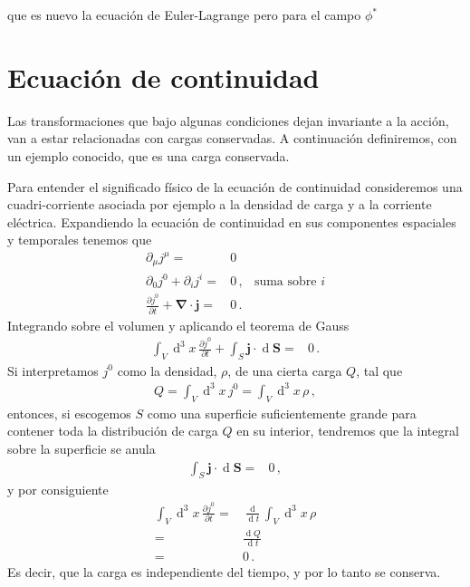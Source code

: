 que es nuevo la ecuación de Euler-Lagrange pero para el campo $\phi^*$



\section{Ecuación de continuidad}
\begin{frame}
Las transformaciones que bajo algunas condiciones dejan invariante a la acción, van a estar relacionadas con cargas conservadas. A continuación definiremos, con un ejemplo conocido, que es una carga conservada.

Para entender el significado físico de la ecuación de continuidad consideremos una cuadri-corriente asociada por ejemplo a la densidad de carga y a la corriente eléctrica. Expandiendo la ecuación de continuidad en sus componentes espaciales y temporales tenemos que
\begin{align}
  \partial_\mu j^\mu=&0&\nonumber\\
  \partial_0 j^0+ \partial_i j^i=&0\,,&\text{suma sobre $i$}\nonumber\\
  \frac{\partial j^0}{\partial t}+ \boldsymbol{\nabla}\cdot\boldsymbol{j}=&0\,.
\end{align}
Integrando sobre el volumen y aplicando el teorema de Gauss
\begin{align}
  \int_V \operatorname{d}^3x\,\frac{\partial j^0}{\partial t}
+\int_S \boldsymbol{j}\cdot \operatorname{d}  \boldsymbol{S}=&0\,.
\end{align}
Si interpretamos $j^0$ como la densidad, $\rho$, de una cierta carga $Q$, tal que
\begin{align}
  Q=\int_{V} \operatorname{d}^3x\, j^0= \int_{V} \operatorname{d}^3x\, \rho\,,
\end{align}
entonces, si escogemos $S$ como una superficie suficientemente grande para contener toda la distribución de carga $Q$ en su interior, tendremos que la integral sobre la superficie se anula
\begin{align}
  \int_S \boldsymbol{j}\cdot \operatorname{d} \boldsymbol{S}=&0\,,
\end{align}
y por consiguiente
\begin{align}
  \int_V \operatorname{d}^3x\,\frac{\partial j^0}{\partial t}=&
\frac{\operatorname{d}}{\operatorname{d}t}\int_V \operatorname{d}^3x\,\rho \nonumber\\
=&\frac{\operatorname{d}Q}{\operatorname{d}t}\nonumber\\
  =&0\,.
\end{align}
Es decir, que la carga es independiente del tiempo, y por lo tanto se conserva.
\end{frame}



